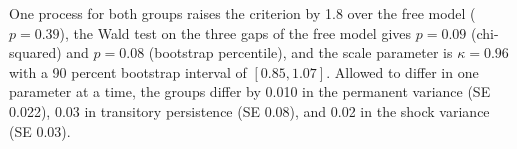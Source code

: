 One process for both groups raises the criterion by 1.8 over the free model ($p = 0.39$), the Wald test on the three gaps of the free model gives $p = 0.09$ (chi-squared) and $p = 0.08$ (bootstrap percentile), and the scale parameter is $\kappa = 0.96$ with a 90 percent bootstrap interval of $[0.85, 1.07]$. Allowed to differ in one parameter at a time, the groups differ by 0.010 in the permanent variance (SE 0.022), 0.03 in transitory persistence (SE 0.08), and 0.02 in the shock variance (SE 0.03).%
